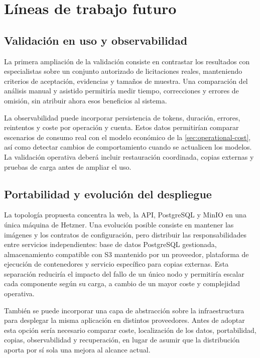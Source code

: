 \section{Líneas de trabajo futuro}

\subsection{Validación en uso y observabilidad}

La primera ampliación de la validación consiste en contrastar los resultados
con especialistas sobre un conjunto autorizado de licitaciones reales,
manteniendo criterios de aceptación, evidencias y tamaños de muestra. Una
comparación del análisis manual y asistido permitiría medir tiempo, correcciones
y errores de omisión, sin atribuir ahora esos beneficios al sistema.

La observabilidad puede incorporar persistencia de tokens, duración, errores,
reintentos y coste por operación y cuenta. Estos datos permitirían comparar
escenarios de consumo real con el modelo económico de la
\cref{sec:operational-cost}, así como detectar cambios de comportamiento cuando
se actualicen los modelos. La validación operativa deberá incluir restauración
coordinada, copias externas y pruebas de carga antes de ampliar el uso.

\subsection{Portabilidad y evolución del despliegue}

La topología propuesta concentra la web, la API, PostgreSQL y MinIO en una única
máquina de Hetzner. Una evolución posible consiste en mantener las imágenes y
los contratos de configuración, pero distribuir las responsabilidades entre
servicios independientes: base de datos PostgreSQL gestionada, almacenamiento
compatible con S3 mantenido por un proveedor, plataforma de ejecución de
contenedores y servicio específico para copias externas. Esta separación
reduciría el impacto del fallo de un único nodo y permitiría escalar cada
componente según su carga, a cambio de un mayor coste y complejidad operativa.

También se puede incorporar una capa de abstracción sobre la infraestructura
para desplegar la misma aplicación en distintos proveedores. Antes de adoptar
esta opción sería necesario comparar coste, localización de los datos,
portabilidad, copias, observabilidad y recuperación, en lugar de asumir que la
distribución aporta por sí sola una mejora al alcance actual.

